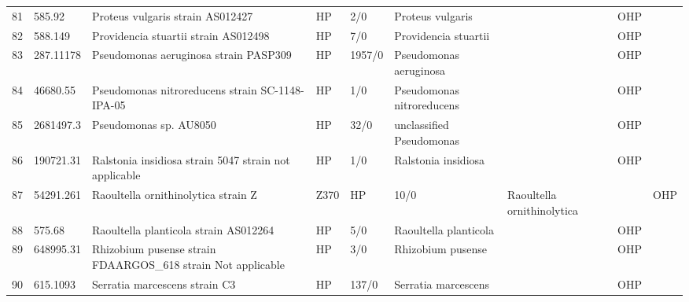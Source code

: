 \begin{longtable}{llllllll}
81  &        585.92 &                                         Proteus vulgaris strain AS012427 &    HP &       2/0 &                               Proteus vulgaris &                             \cite{drzewiecka2016significance} &   OHP \\
82  &       588.149 &                                     Providencia stuartii strain AS012498 &    HP &       7/0 &                           Providencia stuartii &                                         \cite{warda2018first} &   OHP \\
83  &     287.11178 &                                    Pseudomonas aeruginosa strain PASP309 &    HP &    1957/0 &                         Pseudomonas aeruginosa &                                \cite{lyczak2000establishment} &   OHP \\
84  &      46680.55 &                          Pseudomonas nitroreducens strain SC-1148-IPA-05 &    HP &       1/0 &                      Pseudomonas nitroreducens &                       \cite{lyczak2000establishment,46680.55} &   OHP \\
85  &     2681497.3 &                                                   Pseudomonas sp. AU8050 &    HP &      32/0 &                       unclassified Pseudomonas &     \cite{scales2014microbiology,senkowski2020characterizing} &   OHP \\
86  &     190721.31 &                    Ralstonia insidiosa strain 5047 strain not applicable &    HP &       1/0 &                            Ralstonia insidiosa &                                     \cite{fang2019nosocomial} &   OHP \\
87  &     54291.261 &                                 Raoultella ornithinolytica strain Z&Z370 &    HP &      10/0 &                     Raoultella ornithinolytica &                                      \cite{wang2019emergence} &   OHP \\
88  &        575.68 &                                    Raoultella planticola strain AS012264 &    HP &       5/0 &                          Raoultella planticola &                                       \cite{seng2016emerging} &   OHP \\
89  &     648995.31 &             Rhizobium pusense strain FDAARGOS\_618 strain Not applicable &    HP &       3/0 &                              Rhizobium pusense &                                  \cite{aujoulat2015rhizobium} &   OHP \\
90  &      615.1093 &                                            Serratia marcescens strain C3 &    HP &     137/0 &                            Serratia marcescens &                                      \cite{kurz2003virulence} &   OHP \\

\end{longtable}
